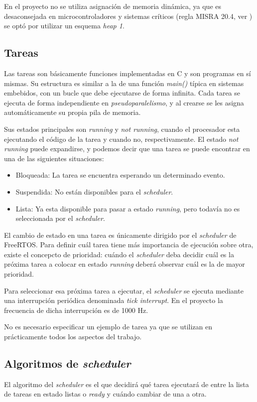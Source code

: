 \documentclass{IEEEtran}
\begin{document}
En el proyecto no se utiliza asignación de memoria dinámica, ya que es desaconsejada en microcontroladores y sistemas críticos (regla MISRA 20.4, ver \textcite{misra-c}) se optó por utilizar un esquema \textit{heap 1}.

\subsection{Tareas}
Las tareas son básicamente funciones implementadas en C y son programas en sí mismas. Su estructura es similar a la de una función \textit{main()} típica en sistemas embebidos, con un bucle que debe ejecutarse de forma infinita. Cada tarea se ejecuta de forma independiente en \textit{pseudoparalelismo}, y al crearse se les asigna automáticamente su propia pila de memoria.

Sus estados principales son \textit{running} y \textit{not running}, cuando el procesador esta ejecutando el código de la tarea y cuando no, respectivamente. El estado \textit{not running} puede expandirse, y podemos decir que una tarea se puede encontrar en una de las siguientes situaciones:

\begin{itemize}
    \item Bloqueada: La tarea se encuentra esperando un determinado evento.
    \item Suspendida: No están disponibles para el \textit{scheduler}.
    \item Lista: Ya esta disponible para pasar a estado \textit{running}, pero todavía no es seleccionada por el \textit{scheduler}.
\end{itemize}

El cambio de estado en una tarea es únicamente dirigido por el \textit{scheduler} de FreeRTOS. Para definir cuál tarea tiene más importancia de ejecución sobre otra, existe el concepcto de prioridad: cuándo el \textit{scheduler} deba decidir cuál es la próxima tarea a colocar en estado \textit{running} deberá observar cuál es la de mayor prioridad.

Para seleccionar esa próxima tarea a ejecutar, el \textit{scheduler} se ejecuta mediante una interrupción periódica denominada \textit{tick interrupt}. En el proyecto la frecuencia de dicha interrupción es de 1000 Hz.

No es necesario especificar un ejemplo de tarea ya que se utilizan en prácticamente todos los aspectos del trabajo.

\subsection{Algoritmos de \textit{scheduler}}
El algoritmo del \textit{scheduler} es el que decidirá qué tarea ejecutará de entre la lista de tareas en estado listas o \textit{ready} y cuándo cambiar de una a otra.
\end{document}
